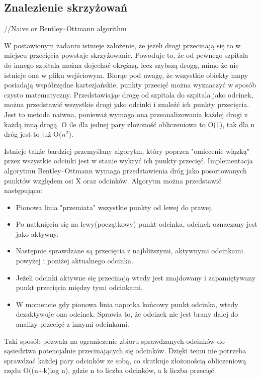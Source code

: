 \documentclass[10pt,a4paper]{article}
\begin{document}
\subsection{Znalezienie skrzyżowań}

//Naive or Bentley–Ottmann algorithm


W postawionym zadaniu istnieje założenie, że jeżeli drogi przecinają się to w miejscu przecięcia powstaje skrzyżowanie.
Powoduje to, że od pewnego szpitala do innego szpitala można dojechać okrężną, lecz szybszą drogą, mimo że nie istnieje ona w pliku wejściowym.
Biorąc pod uwagę, że wszystkie obiekty mapy posiadają współrzędne kartezjańskie, punkty przecięć można wyznaczyć w sposób czysto matematyczny.
Przedstawiając drogę od szpitala do szpitala jako odcinek, można przedstawić wszystkie drogi jako odcinki i znaleźć ich punkty przecięcia.
Jest to metoda naiwna, ponieważ wymaga ona przeanalizowania każdej drogi z każdą inną drogą.
O ile dla jednej pary złożoność obliczeniowa to O(1), tak dla n dróg jest to już O($n^2$).

Istnieje także bardziej przemyślany algorytm, który poprzez "omiecenie wiązką" przez wszystkie odcinki jest w stanie wykryć ich punkty przecięć.
Implementacja algorytmu Bentley–Ottmann wymaga przedstawienia dróg jako posortowanych punktów względem osi X oraz odcinków. Algorytm można przedstawić następująco:
\begin{itemize}
    \item Pionowa linia "przemiata" wszystkie punkty od lewej do prawej.
    \item Po natknięciu się na lewy(początkowy) punkt odcinka, odcinek oznaczany jest jako aktywny.
    \item Następnie sprawdzane są przecięcia z najbliższymi, aktywnymi odcinkami powyżej i poniżej aktualnego odcinka.
    \item Jeżeli odcinki aktywne się przecinają wtedy jest znajdowany i zapamiętywany punkt przecięcia między tymi odcinkami.
    \item W momencie gdy pionowa linia napotka końcowy punkt odcinka, wtedy dezaktywuje ona odcinek. Sprawia to, że odcinek nie jest brany dalej do analizy przecięć z innymi odcinkami.
\end{itemize}
Taki sposób pozwala na ograniczenie zbioru sprawdzanych odcinków do sąsiedztwa potencjalnie przecinających się odcinków.
Dzięki temu nie potrzeba sprawdzać każdej pary odcinków ze sobą, co skutkuje złożonością obliczeniową rzędu O((n+k)log n), gdzie n to liczba odcinków, a k liczba przecięć.
\end{document}
